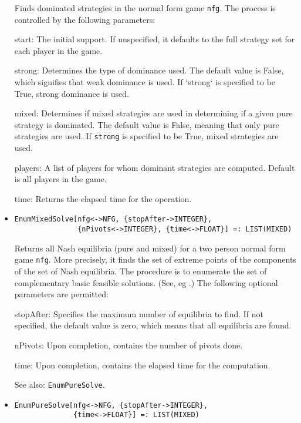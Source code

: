 \begin{itemize}
\bd
Finds dominated strategies in the normal form game \verb+nfg+.
The process is controlled by the following parameters:

\bd
\item
[start:] The initial support.  If unspecified, it defaults to the full
strategy set for each player in the game.  
\item
[strong:] Determines the type of dominance used.  The default value is
False, which signifies that weak dominance is used.  If `strong` is
specified to be True, strong dominance is used.
\item
[mixed:] Determines if mixed strategies are used in determining if a
given pure strategy is dominated.  The default value is False, meaning
that only pure strategies are used. If \verb+strong+ is specified to
be True, mixed strategies are used.
\item
[players:] A list of players for whom dominant strategies are
computed.  Default is all players in the game.  
\item
[time:] Returns the elapsed time for the operation.
\ed
\ed

\item
\protect \large \begin{verbatim}
EnumMixedSolve[nfg<->NFG, {stopAfter->INTEGER},
               {nPivots<->INTEGER}, {time<->FLOAT}] =: LIST(MIXED)
\end{verbatim}\normalsize

\bd
Returns all Nash equilibria (pure and mixed) for a two
person normal form game \verb+nfg+.  More precisely, it finds the set
of extreme points of the components of the set of Nash equilibria.
The procedure is to enumerate the set of complementary basic feasible
solutions. (See, eg \cite[1964]{Man:64}.)  The following optional
parameters are permitted: 
\bd
\item
[stopAfter:] Specifies the maximum number of equilibria to find.  If
not specified, the default value is zero, which means that all
equilibria are found.
\item
[nPivots:] Upon completion, contains the number of pivots done.
\item
[time:] Upon completion, contains the elapsed time for the computation.
\ed
\item
[See also:] {\tt EnumPureSolve}.
\ed

\item
\protect \large \begin{verbatim}
EnumPureSolve[nfg<->NFG, {stopAfter->INTEGER}, 
              {time<->FLOAT}] =: LIST(MIXED) 
\end{verbatim}\normalsize


\end{itemize}
